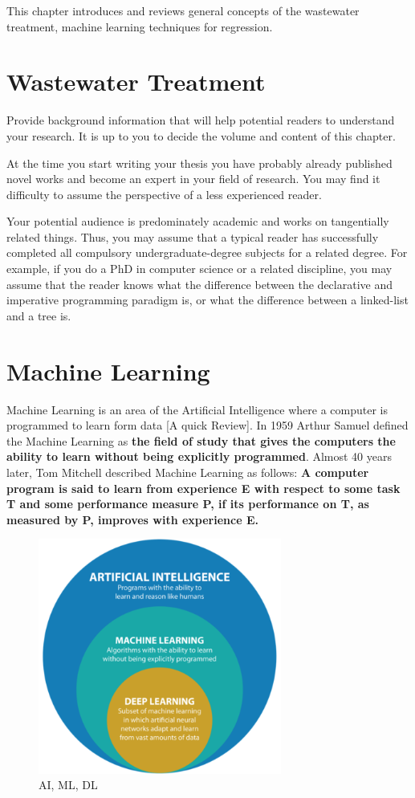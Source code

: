 This chapter introduces and reviews general concepts of the wastewater treatment, machine learning techniques for regression.

\section{Wastewater Treatment}
\label{s:First-Background-Topic}

Provide background information that will help potential readers to understand your research. It is up to you to decide the volume and content of this chapter.

At the time you start writing your thesis you have probably already published novel works and become an expert in your field of research. You may find it difficulty to assume the perspective of a less experienced reader.

Your potential audience is predominately academic and works on tangentially related things. Thus, you may assume that a typical reader has successfully completed all compulsory undergraduate-degree subjects for a related degree. For example, if you do a PhD in computer science or a related discipline, you may assume that the reader knows what the difference between the declarative and imperative programming paradigm is, or what the difference between a linked-list and a tree is.

\section{Machine Learning}
\label{s:Second-Background-Topic}

Machine Learning is an area of the Artificial Intelligence where a computer is programmed to learn form data [A quick Review]. In 1959 Arthur Samuel defined the Machine Learning as \textbf{the field of study that gives the computers the ability to learn without being explicitly programmed}. Almost 40 years later, Tom Mitchell described Machine Learning as follows: \textbf{A computer program is said to learn from experience E with respect to some task T and some performance measure P, if its performance on T, as measured by P, improves with experience E.}


\begin{figure}[t]
\centering
\includegraphics[width=8cm]{figures/AI-ML-DL.png}
\caption{AI, ML, DL}
\label{f:AI}
\end{figure}

